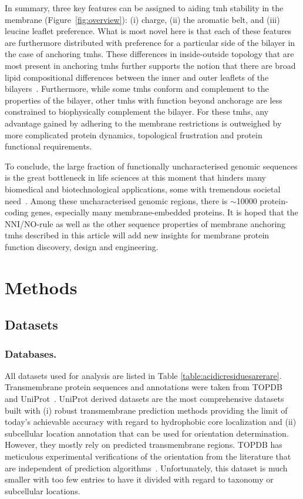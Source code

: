 In summary, three key features can be assigned to aiding \gls{tmh} stability in the membrane (Figure~\ref{fig:overview}): (i) charge, (ii) the aromatic belt, and (iii) leucine leaflet preference.
What is most novel here is that each of these features are furthermore distributed with preference for a particular side of the bilayer in the case of anchoring \gls{tmh}s.
These differences in inside-outside topology that are most present in anchoring \gls{tmh}s further supports the notion that there are broad lipid compositional differences between the inner and outer leaflets of the bilayers~\cite{Sharpe2010}.
Furthermore, while some \gls{tmh}s conform and complement to the properties of the bilayer, other \gls{tmh}s with function beyond anchorage are less constrained to biophysically complement the bilayer.
For these \gls{tmh}s, any advantage gained by adhering to the membrane restrictions is outweighed by more complicated protein dynamics, topological frustration and protein functional requirements.

To conclude, the large fraction of functionally uncharacterised genomic sequences is the great bottleneck in life sciences at this moment that hinders many biomedical and biotechnological applications, some with tremendous societal need~\cite{Eisenhaber2012,Kuznetsov2013}.
Among these uncharacterised genomic regions, there is \(\sim\)10000 protein-coding genes, especially many membrane-embedded proteins.
It is hoped that the NNI/NO-rule as well as the other sequence properties of membrane anchoring \gls{tmh}s described in this article will add new insights for membrane protein function discovery, design and engineering.

\section{Methods}

\subsection{Datasets}
\subsubsection{Databases.}
All datasets used for analysis are listed in Table \ref{table:acidicresiduesarerare}.
Transmembrane protein sequences and annotations were taken from TOPDB~\cite{Dobson2015} and UniProt~\cite{TheUniProtConsortium2014}.
UniProt derived datasets are the most comprehensive datasets built with (i) robust transmembrane prediction methods providing the limit of today’s achievable accuracy with regard to hydrophobic core localization and (ii) subcellular location annotation that can be used for orientation determination.
However, they mostly rely on predicted transmembrane regions.
TOPDB has meticulous experimental verifications of the orientation from the literature that are independent of prediction algorithms~\cite{Dobson2015}.
Unfortunately, this dataset is much smaller with too few entries to have it divided with regard to taxonomy or subcellular locations.

